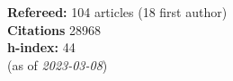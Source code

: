 \textbf{Refereed:} 104 articles (18 first author)\\\textbf{Citations} 28968\\\textbf{h-index:} 44\\(as of \textit{2023-03-08})